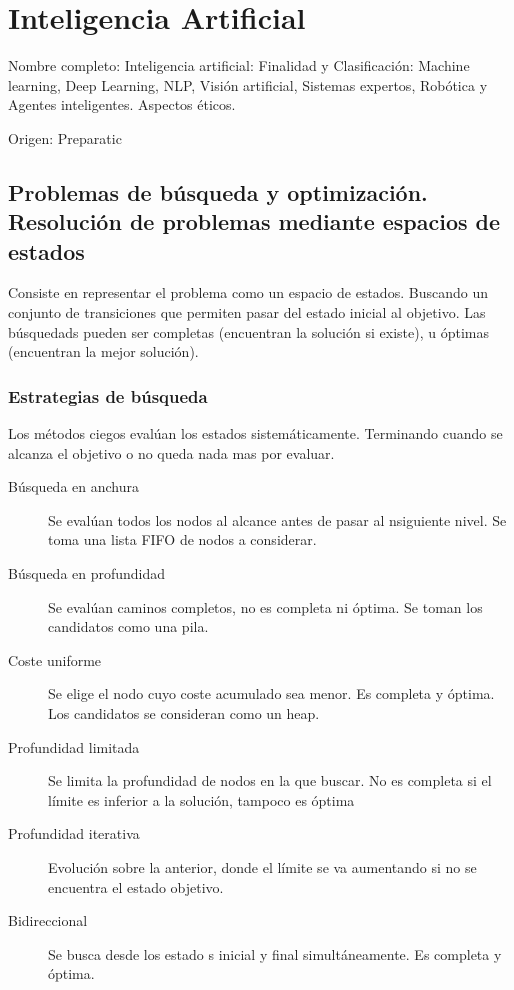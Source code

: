 \setcounter{section}{69}
\section{Inteligencia Artificial}

Nombre completo: Inteligencia artificial: Finalidad y Clasificación: Machine learning, Deep Learning, NLP, Visión artificial, Sistemas expertos, Robótica y Agentes inteligentes. Aspectos éticos.

Origen: Preparatic

\localtableofcontents

\subsection{Problemas de búsqueda y optimización. Resolución de problemas mediante espacios de estados}
    Consiste en representar el problema como un espacio de estados. Buscando un conjunto de transiciones que permiten pasar del estado inicial al objetivo. Las búsquedads pueden ser completas (encuentran la solución si existe), u óptimas (encuentran la mejor solución).

    \subsubsection{Estrategias de búsqueda}
        Los métodos ciegos evalúan los estados sistemáticamente. Terminando cuando se alcanza el objetivo o no queda nada mas por evaluar.
        \begin{description}
            \item[Búsqueda en anchura] Se evalúan todos los nodos al alcance antes de pasar al nsiguiente nivel. Se toma una lista FIFO de nodos a considerar.
            \item[Búsqueda en profundidad] Se evalúan caminos completos, no es completa ni óptima. Se toman los candidatos como una pila.
            \item[Coste uniforme] Se elige el nodo cuyo coste acumulado sea menor. Es completa y óptima. Los candidatos se consideran como un heap.
            \item[Profundidad limitada] Se limita la profundidad de nodos en la que buscar. No es completa si el límite es inferior a la solución, tampoco es óptima
            \item[Profundidad iterativa] Evolución sobre la anterior, donde el límite se va aumentando si no se encuentra el estado objetivo.
            \item[Bidireccional] Se busca desde los estado s inicial y final simultáneamente. Es completa y óptima.
        \end{description}

